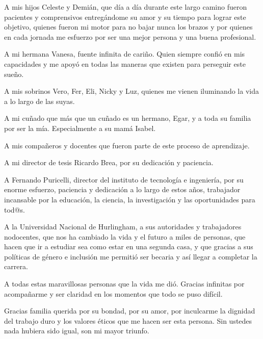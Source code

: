 
\begin{dedication} 

    A mis hijos Celeste y Demián, que día a día durante este largo camino fueron pacientes y comprensivos entregándome su amor y su tiempo para lograr este objetivo, quienes fueron mi motor para no bajar nunca los brazos y por quienes en cada jornada me esfuerzo por ser una mejor persona y una buena profesional.

    A mi hermana Vanesa, fuente infinita de cariño. Quien siempre confió en mis capacidades y me apoyó en todas las maneras que existen para perseguir este sueño. 
    
    A mis sobrinos Vero, Fer, Eli, Nicky y Luz, quienes me vienen iluminando la vida a lo largo de las suyas.
    
    A mi cuñado que más que un cuñado es un hermano, Egar, y a toda su familia por ser la mía. Especialmente a su mamá Isabel.  
    
    A mis compañeros y docentes que fueron parte de este proceso de aprendizaje.
    
    A mi director de tesis Ricardo Brea, por su dedicación y paciencia.
    
    A Fernando Puricelli, director del instituto de tecnología e ingeniería, por su enorme esfuerzo, paciencia y dedicación a lo largo de estos años, trabajador incansable por la educación, la ciencia, la investigación y las oportunidades para tod@s.
    
    A la Universidad Nacional de Hurlingham, a sus autoridades y trabajadores nodocentes, que nos ha cambiado la vida y el futuro a miles de personas, que hacen que ir a estudiar sea como estar en una segunda casa, y que gracias a sus políticas de género e inclusión me permitió ser becaria y así llegar a completar la carrera.
    
    A todas estas maravillosas personas que la vida me dió. Gracias infinitas por acompañarme y ser claridad en los momentos que todo se puso difícil.
    
    Gracias familia querida por su bondad, por su amor, por inculcarme la dignidad del trabajo duro y los valores éticos que me hacen ser esta persona. Sin ustedes nada hubiera sido igual, son mi mayor triunfo.


\end{dedication}

